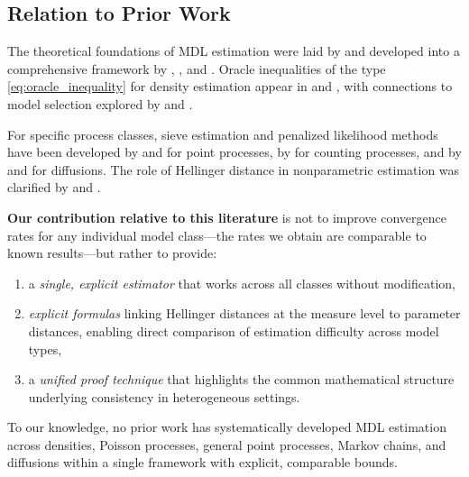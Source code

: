 \documentclass[preprint,review,12pt]{article}
\begin{document}
\subsection{Relation to Prior Work}

The theoretical foundations of MDL estimation were laid by 
\citet{Rissanen1978, Rissanen1983, Rissanen1984} and developed into a 
comprehensive framework by \citet{Barron1991}, \citet{Barron1998}, and 
\citet{Grunwald2007}. Oracle inequalities of the type \eqref{eq:oracle_inequality} 
for density estimation appear in \citet{Barron1999} and \citet{Yang1999}, 
with connections to model selection explored by \citet{Birge1998, Birge2006} 
and \citet{Hansen2001}.

For specific process classes, sieve estimation and penalized likelihood 
methods have been developed by \citet{Karr1987} and \citet{McKeague1986} 
for point processes, by \citet{Andersen1993} for counting processes, and 
by \citet{Kutoyants2004} and \citet{PrakasaRao1999a} for diffusions. The 
role of Hellinger distance in nonparametric estimation was clarified by 
\citet{LeCam1973, LeCam1986} and \citet{Birge1983}.

\textbf{Our contribution relative to this literature} is not to improve 
convergence rates for any individual model class---the rates we obtain are 
comparable to known results---but rather to provide:
\begin{enumerate}[label=(\alph*)]
\item a \emph{single, explicit estimator} that works across all classes 
without modification,
\item \emph{explicit formulas} linking Hellinger distances at the measure 
level to parameter distances, enabling direct comparison of estimation 
difficulty across model types,
\item a \emph{unified proof technique} that highlights the common 
mathematical structure underlying consistency in heterogeneous settings.
\end{enumerate}

To our knowledge, no prior work has systematically developed MDL estimation 
across densities, Poisson processes, general point processes, Markov chains, 
and diffusions within a single framework with explicit, comparable bounds.

\end{document}
